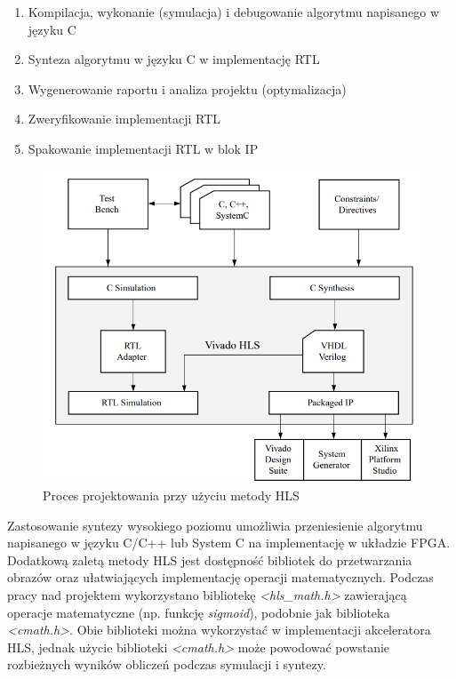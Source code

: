 \begin{enumerate}
    \item Kompilacja, wykonanie (symulacja) i debugowanie algorytmu napisanego w języku C
    \item Synteza algorytmu w języku C w implementację RTL
    \item Wygenerowanie raportu i analiza projektu (optymalizacja)
    \item Zweryfikowanie implementacji RTL
    \item Spakowanie implementacji RTL w blok IP
\end{enumerate}


\begin{figure}[!h]
  \centering
  \includegraphics[width=\textwidth]{img/hls_design_flow.png}
  \caption{Proces projektowania przy użyciu metody HLS \cite{hlsXilinxGuide}}
  \label{hls_design_flow}
\end{figure}

Zastosowanie syntezy wysokiego poziomu umożliwia przeniesienie algorytmu napisanego w języku C/C++ lub System C na implementację w układzie FPGA. Dodatkową zaletą metody HLS jest dostępność bibliotek do przetwarzania 
obrazów oraz ułatwiających implementację operacji matematycznych. Podczas pracy nad projektem wykorzystano bibliotekę \emph
{<hls\_math.h>} zawierającą operacje matematyczne (np. funkcję \emph{sigmoid}), podobnie jak biblioteka \emph{<cmath.h>}. 
Obie biblioteki można wykorzystać w implementacji akceleratora HLS, jednak użycie biblioteki \emph{<cmath.h>} może powodować 
powstanie rozbieżnych wyników obliczeń podczas symulacji i syntezy.


